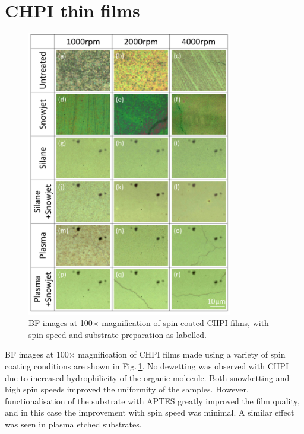 \section{CHPI thin films}
\begin{figure}[ht] 
\centering    
\includegraphics[width=0.8\textwidth]{Fig5}
\caption{BF images at 100$\times$ magnification of spin-coated CHPI films, with spin speed and substrate preparation as labelled.}
\label{4Fig5}
\end{figure}
BF images at 100$\times$ magnification of CHPI films made using a variety of spin coating conditions are shown in Fig.\,\ref{4Fig5}. No dewetting was observed with CHPI due to increased hydrophilicity of the organic molecule. Both snowketting and high spin speeds improved the uniformity of the samples. However, functionalisation of the substrate with APTES greatly improved the film quality, and in this case the improvement with spin speed was minimal. A similar effect was seen in plasma etched substrates.

